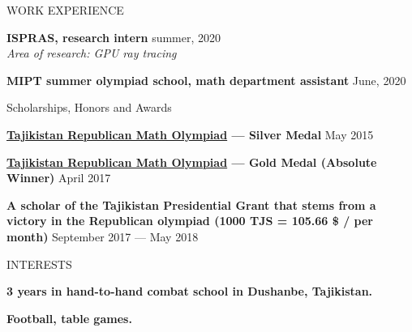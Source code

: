 \documentclass{resume}
\begin{document}



\begin{rSection}{WORK EXPERIENCE} \itemsep -1pt {}  

\item \textbf{ISPRAS, research intern} \hfill summer, 2020 \\
\textit{Area of research: GPU ray tracing}

\item \textbf{MIPT summer olympiad school, math department assistant} \hfill June, 2020 \\
\textit{}
\end{rSection}

\begin{rSection}{Scholarships, Honors and Awards} \itemsep -1pt {}  

\item \textbf{\href{http://mri.tj/?page_id=124}{\underline{Tajikistan Republican Math Olympiad}} --- Silver Medal} \hfill May 2015
\item \textbf{\href{http://mri.tj/?page_id=124}{\underline{Tajikistan Republican Math Olympiad}} --- Gold Medal (Absolute Winner)} \hfill April 2017
\item {\textbf{A scholar of the Tajikistan Presidential Grant that stems from a victory in the Republican olympiad (1000 TJS = 105.66 \$ / per month)}} \hfill September 2017 --- May 2018
\end{rSection}


\begin{rSection}{INTERESTS}
\item \textbf{3 years in hand-to-hand combat school in Dushanbe, Tajikistan.}
\item \textbf{Football,  table games.}
\end{rSection}
\end{document}
